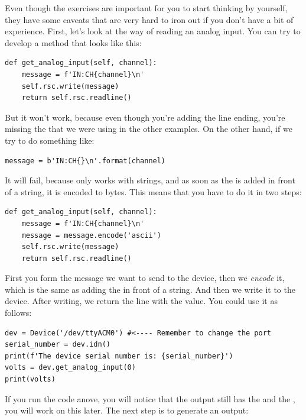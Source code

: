 
Even though the exercises are important for you to start thinking by yourself, they have some caveats that are very hard to iron out if you don't have a bit of experience. First, let's look at the way of reading an analog input. You can try to develop a method that looks like this:

\begin{verbatim}
def get_analog_input(self, channel):
    message = f'IN:CH{channel}\n'
    self.rsc.write(message)
    return self.rsc.readline()
\end{verbatim}

But it won't work, because even though you're adding the line ending, you're missing the  that we were using in the other examples. On the other hand, if we try to do something like:

\begin{verbatim}
message = b'IN:CH{}\n'.format(channel)
\end{verbatim}

It will fail, because  only works with strings, and as soon as the  is added in front of a string, it is encoded to bytes. This means that you have to do it in two steps:

\begin{verbatim}
def get_analog_input(self, channel):
    message = f'IN:CH{channel}\n'
    message = message.encode('ascii')
    self.rsc.write(message)
    return self.rsc.readline()
\end{verbatim}

First you form the message we want to send to the device, then we \emph{encode} it, which is the same as adding the  in front of a string. And then we write it to the device. After writing, we return the line with the value. You could use it as follows:

\begin{verbatim}
dev = Device('/dev/ttyACM0') #<---- Remember to change the port
serial_number = dev.idn()
print(f'The device serial number is: {serial_number}')
volts = dev.get_analog_input(0)
print(volts)
\end{verbatim}

If you run the code anove, you will notice that the output still has the  and the \py{\n}, you will work on this later. The next step is to generate an output:

